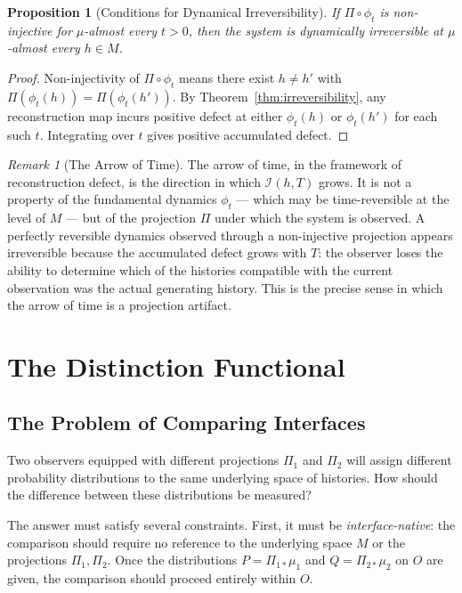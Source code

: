 \documentclass[12pt,a4paper]{article}
\newtheorem{proposition}[theorem]{Proposition}
\theoremstyle{remark}
\newtheorem{remark}{Remark}[section]
\theoremstyle{definition}
\begin{document}
\begin{proposition}[Conditions for Dynamical Irreversibility]
If $\Pi \circ \phi_t$ is non-injective for $\mu$-almost every $t > 0$,
then the system is dynamically irreversible at $\mu$-almost every $h \in M$.
\end{proposition}

\begin{proof}
Non-injectivity of $\Pi \circ \phi_t$ means there exist $h \neq h'$ with
$\Pi(\phi_t(h)) = \Pi(\phi_t(h'))$. By Theorem~\ref{thm:irreversibility},
any reconstruction map incurs positive defect at either $\phi_t(h)$ or
$\phi_t(h')$ for each such $t$. Integrating over $t$ gives positive
accumulated defect.
\end{proof}

\begin{remark}[The Arrow of Time]
The arrow of time, in the framework of reconstruction defect, is the
direction in which $\mathcal{I}(h,T)$ grows. It is not a property of
the fundamental dynamics $\phi_t$ --- which may be time-reversible at
the level of $M$ --- but of the projection $\Pi$ under which the system
is observed. A perfectly reversible dynamics observed through a
non-injective projection appears irreversible because the accumulated
defect grows with $T$: the observer loses the ability to determine which
of the histories compatible with the current observation was the actual
generating history. This is the precise sense in which the arrow of time
is a projection artifact.
\end{remark}


\section{The Distinction Functional}

\subsection{The Problem of Comparing Interfaces}

Two observers equipped with different projections $\Pi_1$ and $\Pi_2$
will assign different probability distributions to the same underlying
space of histories. How should the difference between these distributions
be measured?

The answer must satisfy several constraints. First, it must be
\emph{interface-native}: the comparison should require no reference to
the underlying space $M$ or the projections $\Pi_1, \Pi_2$. Once the
distributions $P = \Pi_{1*}\mu_1$ and $Q = \Pi_{2*}\mu_2$ on $O$ are
given, the comparison should proceed entirely within $O$.
\end{document}
